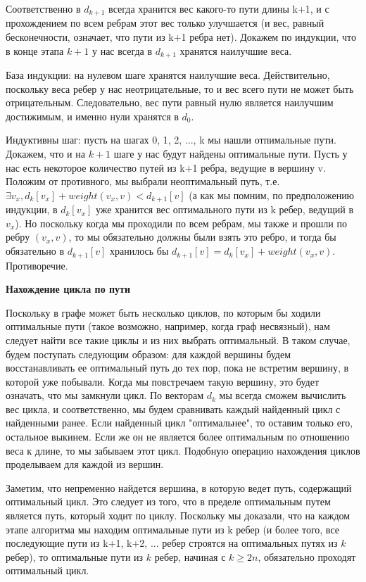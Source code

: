 \documentclass[a4paper,12pt]{article}
\begin{document}
Соответственно в $d_{k+1}$ всегда хранится вес какого-то пути длины k+1, и с прохождением по всем ребрам этот вес только улучшается (и вес, равный бесконечности, означает, что пути из k+1 ребра нет). Докажем по индукции, что в конце этапа $k+1$ у нас всегда в $d_{k+1}$ хранятся наилучшие веса.

База индукции: на нулевом шаге хранятся наилучшие веса. Действительно, поскольку веса ребер у нас неотрицательные, то и вес всего пути не может быть отрицательным. Следовательно, вес пути равный нулю является наилучшим достижимым, и именно нули хранятся в $d_0$.

Индуктивны шаг: пусть на шагах 0, 1, 2, ..., k мы нашли отпимальные пути. Докажем, что и на $k+1$ шаге у нас будут найдены оптимальные пути. Пусть у нас есть некоторое количество путей из k+1 ребра, ведущие в вершину v. Положим от противного, мы выбрали неоптимальный путь, т.е. $\exists v_x, d_k[v_x] + weight(v_x, v) < d_{k+1}[v]$ (а как мы помним, по предположению индукции, в $d_k[v_x]$ уже хранится вес оптимального пути из k ребер, ведущий в $v_x$). Но поскольку когда мы проходили по всем ребрам, мы также и прошли по ребру $(v_x, v)$, то мы обязательно должны были взять это ребро, и тогда бы обязательно в $d_{k+1}[v]$ хранилось бы $d_{k+1}[v] = d_{k}[v_x] + weight(v_x, v)$. Противоречие.

\textbf{Нахождение цикла по пути}

Поскольку в графе может быть несколько циклов, по которым бы ходили оптимальные пути (такое возможно, например, когда граф несвязный), нам следует найти все такие циклы и из них выбрать оптимальный. В таком случае, будем поступать следующим образом: для каждой вершины будем восстанавливать ее оптимальный путь до тех пор, пока не встретим вершину, в которой уже побывали. Когда мы повстречаем такую вершину, это будет означать, что мы замкнули цикл. По векторам $d_k$ мы всегда сможем вычислить вес цикла, и соответственно, мы будем сравнивать каждый найденный цикл с найденными ранее. Если найденный цикл "оптимальнее", то оставим только его, остальное выкинем. Если же он не является более оптимальным по отношению веса к длине, то мы забываем этот цикл. Подобную операцию нахождения циклов проделываем для каждой из вершин.

Заметим, что непременно найдется вершина, в которую ведет путь, содержащий оптимальный цикл. Это следует из того, что в пределе оптимальным путем является путь, который ходит по циклу. Поскольку мы доказали, что на каждом этапе алгоритма мы находим оптимальные пути из k ребер (и более того, все последующие пути из k+1, k+2, ... ребер строятся на оптимальных путях из $k$ ребер), то оптимальные пути из $k$ ребер, начиная с $k \ge 2n$, обязательно проходят оптимальный цикл.
\end{document}
